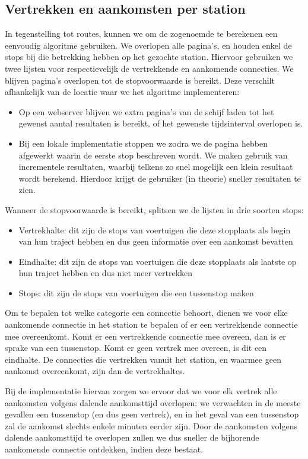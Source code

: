 \subsection{Vertrekken en aankomsten per station}
In tegenstelling tot routes, kunnen we om de zogenoemde  te berekenen een eenvoudig algoritme gebruiken. We overlopen alle pagina's, en houden enkel de stops bij die betrekking hebben op het gezochte station. Hiervoor gebruiken we twee lijsten voor respectievelijk de vertrekkende en aankomende connecties. We blijven pagina's overlopen tot de stopvoorwaarde is bereikt. Deze verschilt afhankelijk van de locatie waar we het algoritme implementeren:
\begin{itemize}
	\item Op een webserver blijven we extra pagina's van de schijf laden tot het gewenst aantal resultaten is bereikt, of het gewenste tijdsinterval overlopen is.
	\item Bij een lokale implementatie stoppen we zodra we de pagina hebben afgewerkt waarin de eerste stop beschreven wordt. We maken gebruik van incrementele resultaten, waarbij telkens zo snel mogelijk een klein resultaat wordt berekend. Hierdoor krijgt de gebruiker (in theorie) sneller resultaten te zien.
\end{itemize}

Wanneer de stopvoorwaarde is bereikt, splitsen we de lijsten in drie soorten stops:
\begin{itemize}
	\item Vertrekhalte:  dit zijn de stops van voertuigen die deze stopplaats als begin van hun traject hebben en dus geen informatie over een aankomst bevatten
	\item Eindhalte: dit zijn de stops van voertuigen die deze stopplaats als laatste op hun traject hebben en dus niet meer vertrekken
	\item Stops: dit zijn de stops van voertuigen die een tussenstop maken
\end{itemize}

Om te bepalen tot welke categorie een connectie behoort, dienen we voor elke aankomende connectie in het station te bepalen of er een vertrekkende connectie mee overeenkomt. Komt er een vertrekkende connectie mee overeen, dan is er sprake van een tussenstop. Komt er geen vertrek mee overeen, is dit een eindhalte. De connecties die vertrekken vanuit het station, en waarmee geen aankomst overeenkomt, zijn dan de vertrekhaltes. 

Bij de implementatie hiervan zorgen we ervoor dat we voor elk vertrek alle aankomsten volgens dalende aankomsttijd overlopen: we verwachten in de meeste gevallen een tussenstop (en dus geen vertrek), en in het geval van een tussenstop zal de aankomst slechts enkele minuten eerder zijn. Door de aankomsten volgens dalende aankomsttijd te overlopen zullen we dus sneller de bijhorende aankomende connectie ontdekken, indien deze bestaat.


